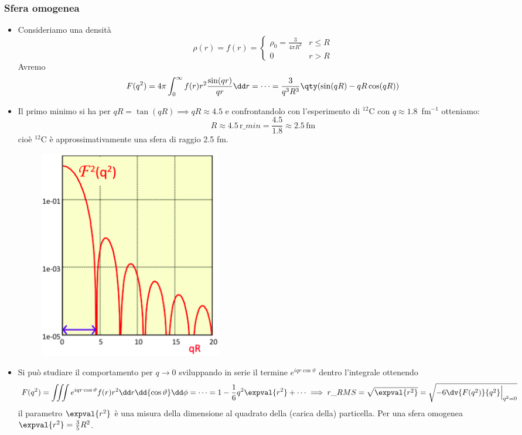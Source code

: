 \subsubsection{Sfera omogenea}
\begin{itemize}
    \item Consideriamo una densità
    \begin{equation*}
        \rho(r)=f(r)=
        \begin{cases}
            \rho_0=\frac3{4\pi R^3} & r\leq R\\
            0 & r>R
        \end{cases}
    \end{equation*}
    Avremo
    \begin{equation*}
    F(q^2)=4\pi\int_0^\infty f(r)r^2\frac{\sin(qr)}{qr}\dd r=\dots=\frac 3{q^3R^3}\qty(\sin(qR)-qR\cos(qR))
    \end{equation*}
    \item Il primo minimo si ha per $qR=\tan(qR)\implies qR\approx4.5$ e confrontandolo con l'esperimento di $^{12}$C con $q\approx1.8\,$ fm$^{-1}$ otteniamo:
    \[ 
    R\approx4.5\, \text{r}\_{min}=\frac{4.5}{1.8}\approx2.5\, \text{fm}
    \] 
    cioè $^{12}$C è approssimativamente una sfera di raggio 2.5 fm.
    \begin{figure}[H]
        \centering
        \includegraphics[width=0.4\textwidth]{immagini/fig_min_F_q.png}
    \end{figure}
    \item Si può studiare il comportamento per $q\to0$ sviluppando in serie il termine $e^{iqr\cos\vartheta}$ dentro l'integrale ottenendo
    \begin{equation*}
    F(q^2)=\iiint e^{iqr\cos\vartheta}f(r)r^2\dd r\dd{\cos\vartheta}\dd\phi =\dots=1-\frac16q^2\expval{r^2}+\dots\implies r\_{RMS}=\sqrt{\expval{r^2}}=\sqrt{-6\dv{F(q^2)}{q^2}\Big|_{q^2=0}}
    \end{equation*}
    il parametro $\expval{r^2}$ è una misura della dimensione al quadrato della  (carica della) particella. Per una sfera omogenea $\expval{r^2}=\frac35R^2$.
\end{itemize}
